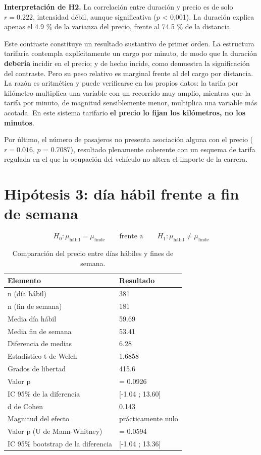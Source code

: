\documentclass[
]{book}
\begin{document}
\textbf{Interpretación de H2.} La correlación entre duración y precio es de solo
\(r = 0.222\), intensidad débil, aunque
significativa (\(p\) \textless{} 0,001). La duración explica apenas el
4.9 \% de la varianza del precio, frente al
74.5 \% de la distancia.

Este contraste constituye un resultado sustantivo de primer orden. La estructura tarifaria
contempla explícitamente un cargo por minuto, de modo que la duración \textbf{debería} incidir en
el precio; y de hecho incide, como demuestra la significación del contraste. Pero su peso
relativo es marginal frente al del cargo por distancia. La razón es aritmética y puede
verificarse en los propios datos: la tarifa por kilómetro multiplica una variable con un
recorrido muy amplio, mientras que la tarifa por minuto, de magnitud sensiblemente menor,
multiplica una variable más acotada. En este sistema tarifario \textbf{el precio lo fijan los
kilómetros, no los minutos}.

Por último, el número de pasajeros no presenta asociación alguna con el precio
(\(r = 0.016\), \(p\) = 0.7087), resultado plenamente
coherente con un esquema de tarifa regulada en el que la ocupación del vehículo no altera el
importe de la carrera.

\section{Hipótesis 3: día hábil frente a fin de semana}\label{hipuxf3tesis-3-duxeda-huxe1bil-frente-a-fin-de-semana}

\[H_0: \mu_{\text{hábil}} = \mu_{\text{finde}} \qquad \text{frente a} \qquad
H_1: \mu_{\text{hábil}} \neq \mu_{\text{finde}}\]

\begin{table}

\caption{\label{tab:h3}Comparación del precio entre días hábiles y fines de semana.}
\centering
\begin{tabular}[t]{l|l}
\hline
Elemento & Resultado\\
\hline
n (día hábil) & 381\\
\hline
n (fin de semana) & 181\\
\hline
Media día hábil & 59.69\\
\hline
Media fin de semana & 53.41\\
\hline
Diferencia de medias & 6.28\\
\hline
Estadístico t de Welch & 1.6858\\
\hline
Grados de libertad & 415.6\\
\hline
Valor p & = 0.0926\\
\hline
IC 95\% de la diferencia & [-1.04 ; 13.60]\\
\hline
d de Cohen & 0.143\\
\hline
Magnitud del efecto & prácticamente nulo\\
\hline
Valor p (U de Mann-Whitney) & = 0.0594\\
\hline
IC 95\% bootstrap de la diferencia & [-1.04 ; 13.36]\\
\hline
\end{tabular}
\end{table}
\end{document}
